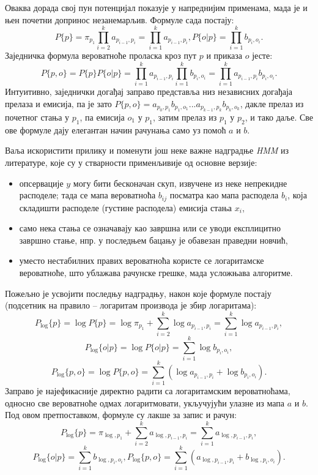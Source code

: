 \documentclass[12pt,oneside]{memoir}
\begin{document}
\begin{CJK}{UTF8}{ipxm}
Оваква дорада свој пун потенцијал показује у напреднијим применама, мада је и њен почетни допринос незанемарљив. Формуле сада постају: $$P\{p\} = \pi_{p_1} \prod_{i=2}^k a_{p_{i-1}, p_i} = \prod_{i=1}^k a_{p_{i-1}, p_i}, P\{o | p\} = \prod_{i=1}^{k} b_{p_i, o_i}.$$ Заједничка формула вероватноће проласка кроз пут $p$ и приказа $o$ јесте: $$P\{p, o\} = P\{p\} P\{o | p\} = \prod_{i=1}^k a_{p_{i-1}, p_i} \prod_{i=1}^k b_{p_i, o_i} = \prod_{i=1}^k a_{p_{i-1}, p_i} b_{p_i, o_i}.$$ Интуитивно, заједнички догађај заправо представља низ независних догађаја прелаза и емисија, па је зато $P\{p, o\} = a_{p_0, p_1} b_{p_1, o_1} ... a_{p_{k-1}, p_k} b_{p_k, o_k}$, дакле прелаз из почетног стања у $p_1$, па емисија $o_1$ у $p_1$, затим прелаз из $p_1$ у $p_2$, и тако даље. Све ове формуле дају елегантан начин рачунања само уз помоћ $a$ и $b$.

Ваља искористити прилику и поменути још неке важне надградње \textit{HMM} из литературе, које су у стварности применљивије од основне верзије:
\begin{itemize}
  \item опсервације $y$ могу бити бесконачан скуп, извучене из неке непрекидне расподеле; тада се мапа вероватноћа $b_{ij}$ посматра као мапа расподела $b_i$, која складишти расподеле (густине расподела) емисија стања $x_i$,
  \item само нека стања се означавају као завршна или се уводи експлицитно завршно стање, нпр. у последњем бацању је обавезан праведни новчић,
  \item уместо нестабилних правих вероватноћа користе се логаритамске вероватноће, што ублажава рачунске грешке, мада усложњава алгоритме.
\end{itemize}

Пожељно је усвојити последњу надградњу, након које формуле постају (подсетник на правило -- логаритам производа је збир логаритама): $$P_{\log}\{p\} = \log P\{p\} = \log \pi_{p_1} + \sum_{i=2}^k \log a_{p_{i-1}, p_i} = \sum_{i=1}^k \log a_{p_{i-1}, p_i},$$ $$P_{\log}\{o | p\} = \log P\{o | p\} = \sum_{i=1}^{k} \log b_{p_i, o_i},$$ $$P_{\log}\{p, o\} = \log P\{p, o\} = \sum_{i=1}^k (\log a_{p_{i-1}, p_i} + \log b_{p_i, o_i}).$$ Заправо је најефикасније директно радити са логаритамским вероватноћама, односно све вероватноће одмах логаритмовати, укључујући улазне из мапа $a$ и $b$. Под овом претпоставком, формуле су лакше за запис и рачун: $$P_{\log}\{p\} = \pi_{\log, p_1} + \sum_{i=2}^k a_{\log, p_{i-1}, p_i} = \sum_{i=1}^k a_{\log, p_{i-1}, p_i},$$ $$P_{\log}\{o | p\} = \sum_{i=1}^{k} b_{\log, p_i, o_i}, P_{\log}\{p, o\} = \sum_{i=1}^k (a_{\log, p_{i-1}, p_i} + b_{\log, p_i, o_i}).$$


\end{CJK}
\end{document}
